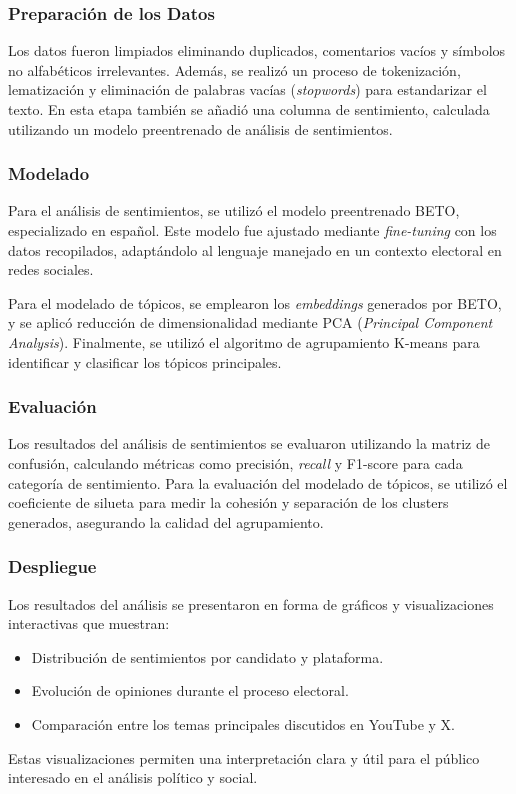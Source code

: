 \documentclass[10pt, a4paper]{article}
\begin{document}
	\subsubsection{Preparación de los Datos}
	Los datos fueron limpiados eliminando duplicados, comentarios vacíos y símbolos no alfabéticos irrelevantes. Además, se realizó un proceso de tokenización, lematización y eliminación de palabras vacías (\textit{stopwords}) para estandarizar el texto. En esta etapa también se añadió una columna de sentimiento, calculada utilizando un modelo preentrenado de análisis de sentimientos.
	
	\subsubsection{Modelado}
	Para el análisis de sentimientos, se utilizó el modelo preentrenado BETO, especializado en español. Este modelo fue ajustado mediante \textit{fine-tuning} con los datos recopilados, adaptándolo al lenguaje manejado en un contexto electoral en redes sociales. 
	
	Para el modelado de tópicos, se emplearon los \textit{embeddings} generados por BETO, y se aplicó reducción de dimensionalidad mediante PCA (\textit{Principal Component Analysis}). Finalmente, se utilizó el algoritmo de agrupamiento K-means para identificar y clasificar los tópicos principales.
	
	\subsubsection{Evaluación}
	Los resultados del análisis de sentimientos se evaluaron utilizando la matriz de confusión, calculando métricas como precisión, \textit{recall} y F1-score para cada categoría de sentimiento. Para la evaluación del modelado de tópicos, se utilizó el coeficiente de silueta para medir la cohesión y separación de los clusters generados, asegurando la calidad del agrupamiento.
	
	\subsubsection{Despliegue}
	Los resultados del análisis se presentaron en forma de gráficos y visualizaciones interactivas que muestran:
	\begin{itemize}
		\item Distribución de sentimientos por candidato y plataforma.
		\item Evolución de opiniones durante el proceso electoral.
		\item Comparación entre los temas principales discutidos en YouTube y X.
	\end{itemize}
	Estas visualizaciones permiten una interpretación clara y útil para el público interesado en el análisis político y social.
	
\end{document}
